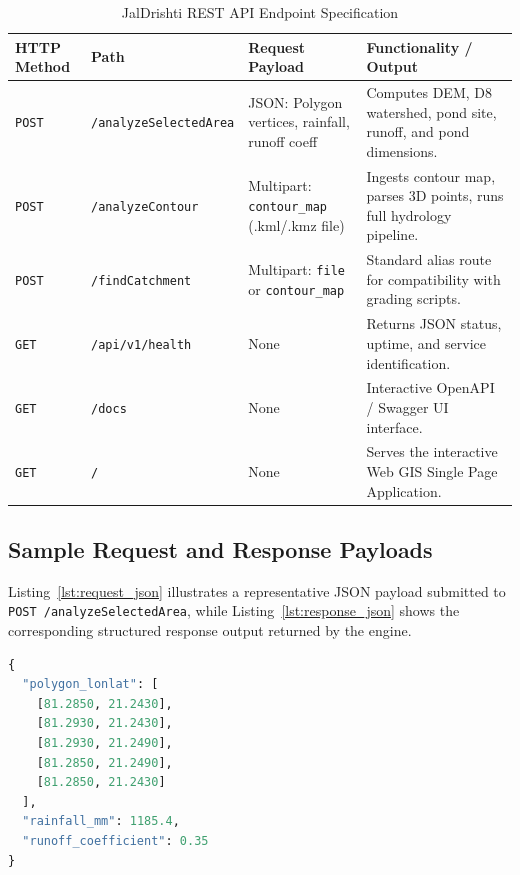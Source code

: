 \documentclass[11pt,a4paper]{article}
\begin{document}
\begin{table}[H]
\centering
\small
\caption{JalDrishti REST API Endpoint Specification}
\label{tab:endpoints}
\vspace{-0.2cm}
\begin{tabularx}{\linewidth}{llp{3.5cm}X}
\toprule
\textbf{HTTP Method} & \textbf{Path} & \textbf{Request Payload} & \textbf{Functionality / Output} \\
\midrule
\texttt{POST} & \texttt{/analyzeSelectedArea} & JSON: Polygon vertices, rainfall, runoff coeff & Computes DEM, D8 watershed, pond site, runoff, and pond dimensions. \\
\texttt{POST} & \texttt{/analyzeContour} & Multipart: \texttt{contour\_map} (.kml/.kmz file) & Ingests contour map, parses 3D points, runs full hydrology pipeline. \\
\texttt{POST} & \texttt{/findCatchment} & Multipart: \texttt{file} or \texttt{contour\_map} & Standard alias route for compatibility with grading scripts. \\
\texttt{GET} & \texttt{/api/v1/health} & None & Returns JSON status, uptime, and service identification. \\
\texttt{GET} & \texttt{/docs} & None & Interactive OpenAPI / Swagger UI interface. \\
\texttt{GET} & \texttt{/} & None & Serves the interactive Web GIS Single Page Application. \\
\bottomrule
\end{tabularx}
\end{table}

\subsection{Sample Request and Response Payloads}
Listing~\ref{lst:request_json} illustrates a representative JSON payload submitted to \texttt{POST /analyzeSelectedArea}, while Listing~\ref{lst:response_json} shows the corresponding structured response output returned by the engine.

\begin{lstlisting}[language=Python, caption={Request Payload for \texttt{/analyzeSelectedArea}}, label={lst:request_json}]
{
  "polygon_lonlat": [
    [81.2850, 21.2430],
    [81.2930, 21.2430],
    [81.2930, 21.2490],
    [81.2850, 21.2490],
    [81.2850, 21.2430]
  ],
  "rainfall_mm": 1185.4,
  "runoff_coefficient": 0.35
}
\end{lstlisting}
\end{document}

